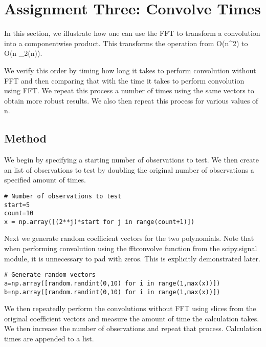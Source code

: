 
\section{Assignment Three: Convolve Times} %
\label{sec:assignment_three_convolve_times}

In this section, we illustrate how one can use the FFT to transform a convolution into a componentwise product. This transforms the operation from O(n^2) to O(n \log_2(n)). 

We verify this order by timing how long it takes to perform convolution without FFT and then comparing that with the time it takes to perform convolution using FFT. We repeat this process a number of times using the same vectors to obtain more robust results. We also then repeat this process for various values of n.


\subsection{Method} %
\label{sub:method}

We begin by specifying a starting number of observations to test. We then create an list of observations to test by doubling the original number of observations a specified amount of times. 


\begin{lstlisting}[caption={Creating a list of n observations to test},label=lst:example,firstnumber=65]
# Number of observations to test
start=5
count=10
x = np.array([(2**j)*start for j in range(count+1)])
\end{lstlisting}

Next we generate random coefficient vectors for the two polynomials. Note that when performing convolution using the fftconvolve function from the scipy.signal module, it is unnecessary to pad with zeros. This is explicitly demonstrated later.

\begin{lstlisting}[caption={Generating Coefficient Vectors},label=lst:example,firstnumber=65]
# Generate random vectors 
a=np.array([random.randint(0,10) for i in range(1,max(x))])
b=np.array([random.randint(0,10) for i in range(1,max(x))])
\end{lstlisting}

We then repeatedly perform the convolutions without FFT using slices from the original coefficient vectors and measure the amount of time the calculation takes. We then increase the number of observations and repeat that process. Calculation times are appended to a list.


